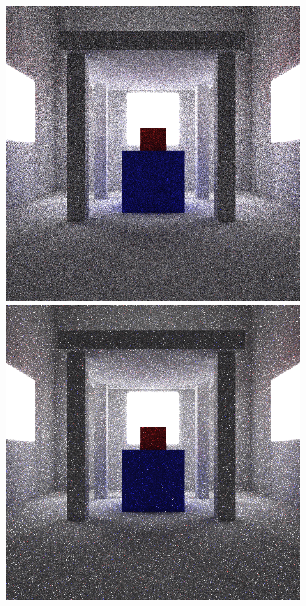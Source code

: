 \documentclass[ %
                    author={Callum Pearce},
                supervisor={Dr. Neill Campbell},
                    degree={MEng},
                     title={Learning the incident radiance for a continuous state space rather than a discrete one is more beneficial for Importance Sampling in Monte Carlo Path tracing},
                  subtitle={},
                      type={research},
                      year={2019} ]{dissertation}
\begin{document}
\begin{figure}[h]
\centering
{}
  \includegraphics[width=\textwidth]{images/renders/shelter/default.png}   
\endminipage\hspace{1em}
  \includegraphics[width=\textwidth]{images/renders/shelter/sarsa.png}   

\end{figure}
\end{document}
